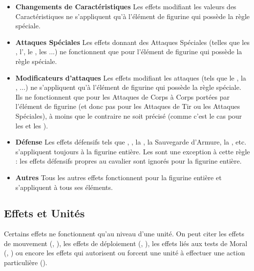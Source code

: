 \begin{itemize}[label={\textbullet}]
\item \textbf{Changements de Caractéristiques}\newline
Les effets modifiant les valeurs des Caractéristiques ne s'appliquent qu'à l'élément de figurine qui possède la règle spéciale.
\item \textbf{Attaques Spéciales}\newline
Les effets donnant des Attaques Spéciales (telles que les \grindingattacks{}, l'\breathweapon{}, le \stomp{}, les \impacthits{}...) ne fonctionnent que pour l'élément de figurine qui possède la règle spéciale.
\item \textbf{Modificateurs d'attaques}\newline
Les effets modifiant les attaques (tels que le , la \hatred{}, \armourpiercing{}...) ne s'appliquent qu'à l'élément de figurine qui possède la règle spéciale. Ils ne fonctionnent que pour les Attaques de Corps à Corps portées par l'élément de figurine (et donc pas pour les Attaques de Tir ou les Attaques Spéciales), à moins que le contraire ne soit précisé (comme c'est le cas pour les \poisonedattacks{} et les \magicalattacks{}).
\item \textbf{Défense}\newline
Les effets défensifs tels que \distracting{}, \fireborn{}, la \regeneration{}, la Sauvegarde d'Armure, la \wardsave{}, etc. s'appliquent toujours à la figurine entière.\newline
Les \riddenmonsters{} sont une exception à cette règle : les effets défensifs propres au cavalier sont ignorés pour la figurine entière.
\item \textbf{Autres}\newline
Tous les autres effets fonctionnent pour la figurine entière et s'appliquent à tous ses éléments.
\end{itemize}

\subsection{Effets et Unités}

Certains effets ne fonctionnent qu'au niveau d'une unité. On peut citer les effets de mouvement (\fastcavalry{}, \fly{}), les effets de déploiement (\vanguard{}, \scout{}), les effets liés aux tests de Moral (\unbreakable{}, \unstable{}) ou encore les effets qui autorisent ou forcent une unité à effectuer une action particulière (\frenzy{}).

